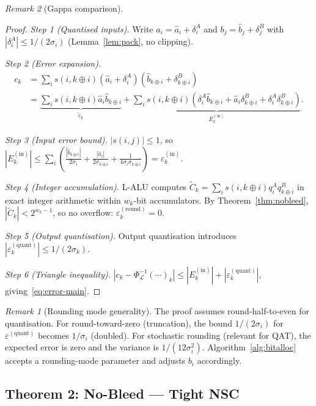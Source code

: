 \documentclass[11pt,a4paper]{article}
\theoremstyle{definition}
\theoremstyle{plain}
\theoremstyle{remark}
\newtheorem{remark}{Remark}[section]
\newcommand{\Unpack}{\Phi^{-1}_{\mathcal{L}}}
\begin{document}
\begin{remark}[Gappa comparison]
\begin{proof}
\textit{Step 1 (Quantised inputs).}
Write $a_i = \hat{a}_i + \delta_i^A$ and $b_j = \hat{b}_j + \delta_j^B$
with $|\delta_i^A| \le 1/(2\sigma_i)$ (Lemma~\ref{lem:pack}, no clipping).

\textit{Step 2 (Error expansion).}
\begin{align}
  c_k &= \sum_i s(i,k\oplus i)(\hat{a}_i+\delta_i^A)(\hat{b}_{k\oplus i}+\delta_{k\oplus i}^B)\nonumber\\
  &= \underbrace{\sum_i s(i,k\oplus i)\hat{a}_i\hat{b}_{k\oplus i}}_{\tilde{c}_k}
   + \underbrace{\sum_i s(i,k\oplus i)
     (\delta_i^A\hat{b}_{k\oplus i}+\hat{a}_i\delta_{k\oplus i}^B+\delta_i^A\delta_{k\oplus i}^B)}_{E_k^{(\mathrm{in})}}.\label{eq:expand}
\end{align}

\textit{Step 3 (Input error bound).}
$|s(i,j)|\le 1$, so $|E_k^{(\mathrm{in})}| \le \sum_i\!\left(\frac{|\hat{b}_{k\oplus i}|}{2\sigma_i}+\frac{|\hat{a}_i|}{2\sigma_{k\oplus i}}+\frac{1}{4\sigma_i\sigma_{k\oplus i}}\right)=\varepsilon_k^{(\mathrm{in})}$.

\textit{Step 4 (Integer accumulation).}
L-ALU computes $\tilde{C}_k = \sum_i s(i,k\oplus i)q_i^A q_{k\oplus i}^B$ in
exact integer arithmetic within $w_k$-bit accumulators.
By Theorem~\ref{thm:nobleed}, $|{\tilde{C}_k}| < 2^{w_k-1}$, so no overflow: $\varepsilon_k^{(\mathrm{round})}=0$.

\textit{Step 5 (Output quantisation).}
Output quantisation introduces $|\varepsilon_k^{(\mathrm{quant})}|\le 1/(2\sigma_k)$.

\textit{Step 6 (Triangle inequality).}
$|c_k - \Unpack(\cdots)_k|\le|E_k^{(\mathrm{in})}|+|\varepsilon_k^{(\mathrm{quant})}|$, giving~\eqref{eq:error-main}.
\end{proof}

\begin{remark}[Rounding mode generality]\label{rem:rounding}
The proof assumes round-half-to-even for quantisation.
For round-toward-zero (truncation), the bound $1/(2\sigma_i)$ for
$\varepsilon^{(\mathrm{quant})}$ becomes $1/\sigma_i$ (doubled).
For stochastic rounding (relevant for QAT), the expected error is zero
and the variance is $1/(12\sigma_i^2)$.
Algorithm~\ref{alg:bitalloc} accepts a rounding-mode parameter and
adjusts $b_i$ accordingly.
\end{remark}

\subsection{Theorem 2: No-Bleed --- Tight NSC}
\label{sec:nobleed}


\end{remark}
\end{document}
